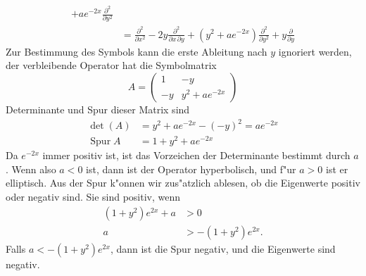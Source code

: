 \begin{loesung}
\begin{align*}
+ae^{-2x}\frac{\partial^2}{\partial y^2}
\\
&=
\frac{\partial^2}{\partial x^2} - 2y\frac{\partial^2}{\partial x\,\partial y}
+(y^2+ae^{-2x})\frac{\partial^2}{\partial y^2}+y\frac{\partial}{\partial y}
\end{align*}
Zur Bestimmung des Symbols kann die erste Ableitung nach $y$ ignoriert werden,
der verbleibende Operator hat die Symbolmatrix
\[
A=\begin{pmatrix}
1&-y\\
-y&y^2+ae^{-2x}
\end{pmatrix}
\]
Determinante und Spur dieser Matrix sind
\begin{align*}
\det(A) &= y^2+ae^{-2x}-(-y)^2=ae^{-2x}
\\
\operatorname{Spur}A&=1+y^2+ae^{-2x}
\end{align*}
Da $e^{-2x}$ immer positiv ist, ist das Vorzeichen der Determinante bestimmt
durch $a$.
Wenn also $a<0$ ist, dann ist der Operator hyperbolisch, und f"ur $a>0$
ist er elliptisch.
Aus der Spur k"onnen wir zus"atzlich ablesen, ob die Eigenwerte positiv
oder negativ sind.
Sie sind positiv, wenn 
\begin{align*}
(1+y^2)e^{2x}+a&>0
\\
a &> -(1+y^2)e^{2x}.
\end{align*}
Falls $a < -(1+y^2)e^{2x}$, dann ist die Spur negativ, und die Eigenwerte
sind negativ.
\end{loesung}



